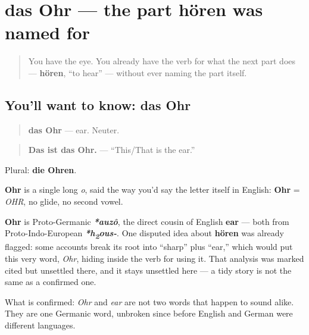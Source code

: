 \section[das Ohr]{das Ohr — the part hören was named for}

\label{lesson:GE-C30-ohr}



\begin{quote}
You have the eye. You already have the verb for what the next part does — \textbf{hören}, \textquotedblleft{}to hear\textquotedblright{} — without ever naming the part itself.
\end{quote}

\subsection*{You'll want to know: das Ohr}
\begin{quote}
\textbf{das Ohr} — ear. Neuter.
\end{quote}

\begin{quote}
\textbf{Das ist das Ohr.} — \textquotedblleft{}This/That is the ear.\textquotedblright{}
\end{quote}

Plural: \textbf{die Ohren}.

\begin{sounds}
\textbf{Ohr} is a single long \emph{o}, said the way you'd say the letter itself in English: \textbf{Ohr} = \emph{OHR}, no glide, no second vowel.
\end{sounds}

\begin{cousinweb}
\textbf{Ohr} is Proto-Germanic \emph{\textbf{*auzô}}, the direct cousin of English \textbf{ear} — both from Proto-Indo-European \emph{\textbf{*h\textsubscript{2}ous-}}. One disputed idea about \textbf{hören} was already flagged: some accounts break its root into \textquotedblleft{}sharp\textquotedblright{} plus \textquotedblleft{}ear,\textquotedblright{} which would put this very word, \emph{Ohr}, hiding inside the verb for using it. That analysis was marked cited but unsettled there, and it stays unsettled here — a tidy story is not the same as a confirmed one.

What is confirmed: \emph{Ohr} and \emph{ear} are not two words that happen to sound alike. They are one Germanic word, unbroken since before English and German were different languages.
\end{cousinweb}

